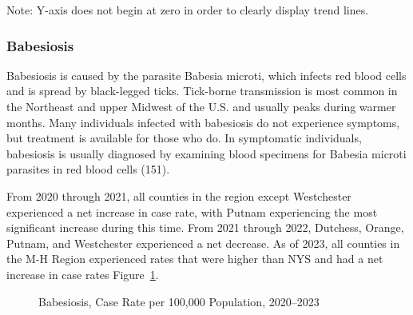 \documentclass[
  english,
  letterpaper,
]{report}
\begin{document}
\begin{tcolorbox}[enhanced jigsaw, breakable, leftrule=.75mm, title=\textcolor{quarto-callout-note-color}{\faInfo}\hspace{0.5em}{Note}, bottomrule=.15mm, opacityback=0, left=2mm, colback=white, bottomtitle=1mm, coltitle=black, colbacktitle=quarto-callout-note-color!10!white, colframe=quarto-callout-note-color-frame, opacitybacktitle=0.6, toptitle=1mm, titlerule=0mm, arc=.35mm, rightrule=.15mm, toprule=.15mm]

Note: Y-axis does not begin at zero in order to clearly display trend
lines.

\end{tcolorbox}

\subsubsection{Babesiosis}\label{babesiosis}

Babesiosis is caused by the parasite Babesia microti, which infects red
blood cells and is spread by black-legged ticks. Tick-borne transmission
is most common in the Northeast and upper Midwest of the U.S. and
usually peaks during warmer months. Many individuals infected with
babesiosis do not experience symptoms, but treatment is available for
those who do. In symptomatic individuals, babesiosis is usually
diagnosed by examining blood specimens for Babesia microti parasites in
red blood cells (151).

From 2020 through 2021, all counties in the region except Westchester
experienced a net increase in case rate, with Putnam experiencing the
most significant increase during this time. From 2021 through 2022,
Dutchess, Orange, Putnam, and Westchester experienced a net decrease. As
of 2023, all counties in the M-H Region experienced rates that were
higher than NYS and had a net increase in case rates
Figure~\ref{fig-babesiosis}.

\begin{figure}


\caption{\label{fig-babesiosis}Babesiosis, Case Rate per 100,000
Population, 2020--2023}

\end{figure}%
\end{document}
